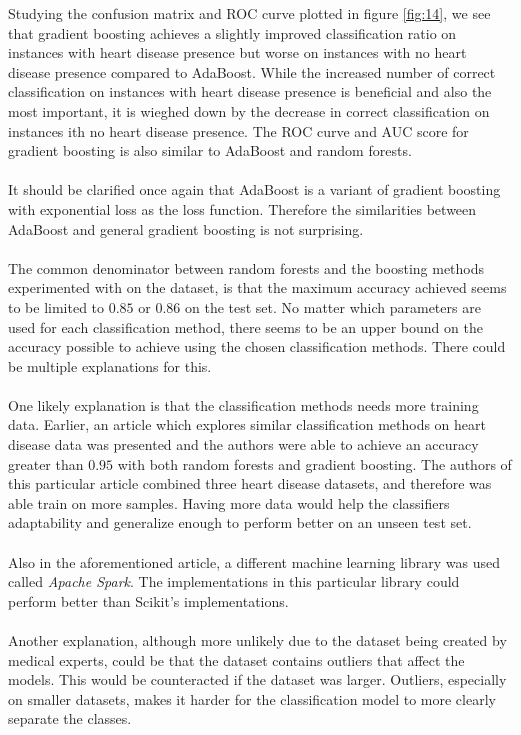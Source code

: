 \documentclass[a4paper,twocolumn]{article}
\begin{document}
Studying the confusion matrix and ROC curve plotted in figure \ref{fig:14}, we see that gradient boosting achieves a slightly improved classification ratio on instances with heart disease presence but worse on instances with no heart disease presence compared to AdaBoost. While the increased number of correct classification on instances with heart disease presence is beneficial and also the most important, it is wieghed down by the decrease in correct classification on instances ith no heart disease presence. The ROC curve and AUC score for gradient boosting is also similar to AdaBoost and random forests. \\
\\
It should be clarified once again that AdaBoost is a variant of gradient boosting with exponential loss as the loss function. Therefore the similarities between AdaBoost and general gradient boosting is not surprising.\\
\\
The common denominator between random forests and the boosting methods experimented with on the dataset, is that the maximum accuracy achieved seems to be limited to $0.85$ or $0.86$ on the test set. No matter which parameters are used for each classification method, there seems to be an upper bound on the accuracy possible to achieve using the chosen classification methods. There could be multiple explanations for this.\\
\\
One likely explanation is that the classification methods needs more training data. Earlier, an article\cite{introarticle} which explores similar classification methods on heart disease data was presented and the authors were able to achieve an accuracy greater than $0.95$ with both random forests and gradient boosting. The authors of this particular article combined three heart disease datasets, and therefore was able train on more samples. Having more data would help the classifiers adaptability and generalize enough to perform better on an unseen test set.
\\
\\
Also in the aforementioned article, a different machine learning library was used called \textit{Apache Spark}. The implementations in this particular library could perform better than Scikit's implementations.\\
\\
Another explanation, although more unlikely due to the dataset being created by medical experts, could be that the dataset contains outliers that affect the models. This would be counteracted if the dataset was larger. Outliers, especially on smaller datasets, makes it harder for the classification model to more clearly separate the classes.
\newpage
\end{document}
